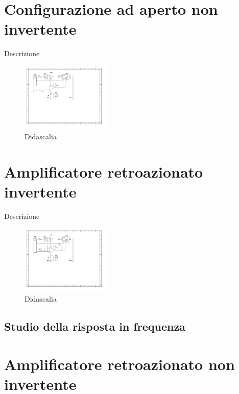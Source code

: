 \documentclass[journal]{IEEEtran}
\begin{document}
\section{\textbf{Configurazione ad aperto non invertente}} %
Descrizione

\begin{figure}[H]%
\begin {center}
\includegraphics[width=0.38\textwidth]{sch-simulations/output/OPA-open-loop-non-inverting.pdf}
\caption{Didascalia}
\label{fig:oscilloscope}
\end {center}
\end{figure}


\section{\textbf{Amplificatore retroazionato invertente}} %
Descrizione

\begin{figure}[H]%
\begin {center}
\includegraphics[width=0.38\textwidth]{sch-simulations/output/OPA-closed-loop-inverting.pdf}
\caption{Didascalia}
\label{fig:oscilloscope}
\end {center}
\end{figure}

\subsection{Studio della risposta in frequenza}


\section{\textbf{Amplificatore retroazionato non invertente}} %
\end{document}
